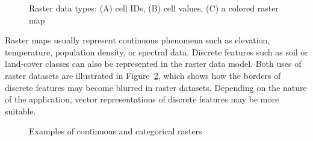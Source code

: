 \documentclass[
  letterpaper,
]{krantz}
\begin{document}
\begin{figure}


\caption{\label{fig-raster-intro-plot1}Raster data types: (A) cell IDs,
(B) cell values, (C) a colored raster map}

\end{figure}%

Raster maps usually represent continuous phenomena such as elevation,
temperature, population density, or spectral data. Discrete features
such as soil or land-cover classes can also be represented in the raster
data model. Both uses of raster datasets are illustrated in
Figure~\ref{fig-raster-intro-plot2}, which shows how the borders of
discrete features may become blurred in raster datasets. Depending on
the nature of the application, vector representations of discrete
features may be more suitable.

\begin{figure}


\caption{\label{fig-raster-intro-plot2}Examples of continuous and
categorical rasters}

\end{figure}%
\end{document}

